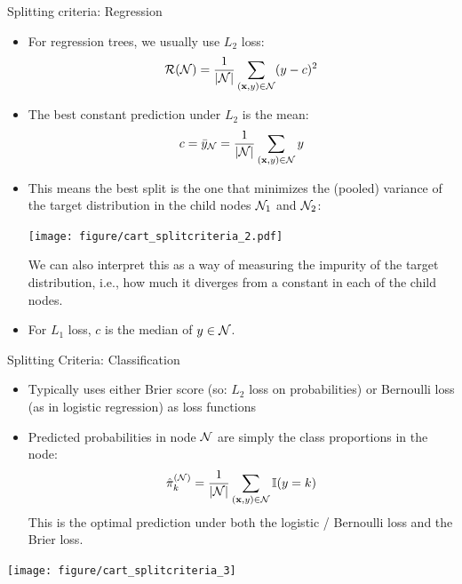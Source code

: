\documentclass[11pt,compress,t,notes=noshow, xcolor=table]{beamer}
\begin{document}
\begin{vbframe}{Splitting criteria: Regression}
\begin{itemize}
 \item For regression trees, we usually use $L_2$ loss:
  $$\mathcal{R}(\mathcal{N}) = \frac{1}{|\mathcal{N}|} \sum\limits_{(\mathbf{x},y) \in \mathcal{N}} (y - c)^2$$
 \item The best constant prediction under $L_2$ is the mean:
  $$c = \bar{y}_{\mathcal{N}} = \frac{1}{|\mathcal{N}|} \sum\limits_{(\mathbf{x},y) \in \mathcal{N}} y$$
\end{itemize}

\framebreak

\begin{itemize}
\item This means the best split is the one that minimizes the (pooled) variance of the target distribution in the child nodes $\mathcal{N}_1$ and $\mathcal{N}_2$:
\begin{knitrout}\scriptsize
{}\color{fgcolor}

{\centering \texttt{[image: figure/cart\_splitcriteria\_2.pdf]} 

}



\end{knitrout}
We can also interpret this as a way of measuring the impurity of the target distribution, i.e., how much it diverges from a constant in each of the child nodes.
\item For $L_1$ loss, $c$ is the median of $y \in \mathcal{N}$.
\end{itemize}
\end{vbframe}

\begin{vbframe}{Splitting Criteria: Classification}

\begin{itemize}
\item Typically uses either Brier score (so: $L_2$ loss on probabilities) or  Bernoulli loss (as in logistic regression) as loss functions
\item Predicted probabilities in node $\mathcal{N}$ are simply the class proportions in the node:
$$ \hat\pi_k^{(\mathcal{N})} = \frac{1}{|\mathcal{N}|} \sum\limits_{(\mathbf{x},y) \in \mathcal{N}} \mathbb{I}(y = k) $$
This is the optimal prediction under both the logistic / Bernoulli loss and the Brier loss.
\end{itemize}

\begin{knitrout}\scriptsize
{}\color{fgcolor}

{\centering \texttt{[image: figure/cart\_splitcriteria\_3]} 

}



\end{knitrout}
\end{vbframe}
\end{document}
